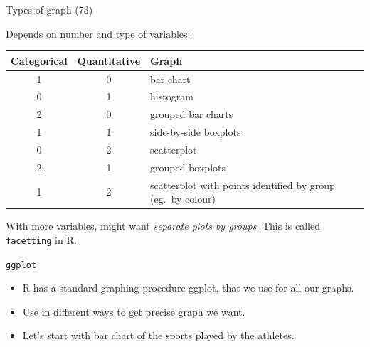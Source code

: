 \documentclass[ignorenonframetext,]{beamer}
\providecommand{\tightlist}{%
  \setlength{\itemsep}{0pt}\setlength{\parskip}{0pt}}
\begin{document}
\begin{frame}[fragile]{Types of graph (73)}
\protect\hypertarget{types-of-graph-73}{}

Depends on number and type of variables:

\begin{tabular}{ccp{}}
    Categorical & Quantitative & Graph\\
    \hline
    1 & 0 & bar chart\\
    0 & 1 & histogram\\
    2 & 0 & grouped bar charts\\
    1 & 1 & side-by-side boxplots\\
    0 & 2 & scatterplot\\
    2 & 1 & grouped boxplots\\
    1 & 2 & scatterplot with points identified by group (eg.\ by colour)\\
    \hline
  \end{tabular}

With more variables, might want \emph{separate plots by groups}. This is
called \texttt{facetting} in R.

\end{frame}

\begin{frame}{\texttt{ggplot}}
\protect\hypertarget{ggplot}{}

\begin{itemize}
\tightlist
\item
  R has a standard graphing procedure ggplot, that we use for all our
  graphs.
\item
  Use in different ways to get precise graph we want.
\item
  Let's start with bar chart of the sports played by the athletes.
\end{itemize}

\end{frame}
\end{document}
